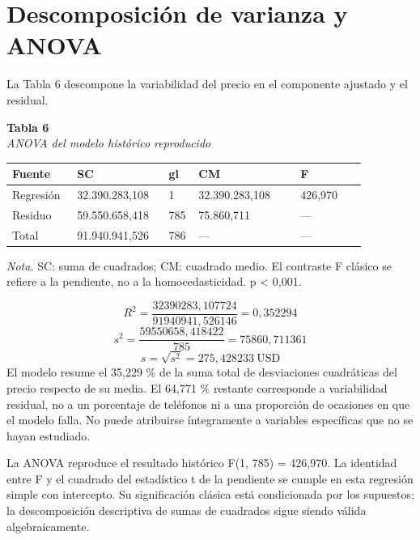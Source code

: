 \documentclass[12pt,letterpaper]{article}
\begin{document}
\clearpage
\section*{Descomposición de varianza y ANOVA}
La Tabla 6 descompone la variabilidad del precio en el componente ajustado y el residual.

\begin{center}\begin{minipage}{\linewidth}\textbf{Tabla 6}\\\textit{ANOVA del modelo histórico reproducido}\\\begin{singlespace}\small
\begin{tabular}{@{}p{0.1517\linewidth}p{0.2329\linewidth}p{0.0470\linewidth}p{0.2671\linewidth}p{0.1731\linewidth}@{}}\toprule
\textbf{Fuente} & \textbf{SC} & \textbf{gl} & \textbf{CM} & \textbf{F}\\\midrule
Regresión & 32.390.283,108 & 1 & 32.390.283,108 & 426,970\\
Residuo & 59.550.658,418 & 785 & 75.860,711 & —\\
Total & 91.940.941,526 & 786 & — & —\\
\bottomrule\end{tabular}\end{singlespace}
\small\textit{Nota.} SC: suma de cuadrados; CM: cuadrado medio. El contraste F clásico se refiere a la pendiente, no a la homocedasticidad. p < 0,001.
\end{minipage}\end{center}
\begin{equation*}R^2=\frac{32390283{,}107724}{91940941{,}526146}=0{,}352294\end{equation*}
\begin{equation*}s^2=\frac{59550658{,}418422}{785}=75860{,}711361\end{equation*}
\begin{equation*}s=\sqrt{s^2}=275{,}428233\ \mathrm{USD}\end{equation*}
El modelo resume el 35,229 \% de la suma total de desviaciones cuadráticas del precio respecto de su media. El 64,771 \% restante corresponde a variabilidad residual, no a un porcentaje de teléfonos ni a una proporción de ocasiones en que el modelo falla. No puede atribuirse íntegramente a variables específicas que no se hayan estudiado.

La ANOVA reproduce el resultado histórico F(1, 785) = 426,970. La identidad entre F y el cuadrado del estadístico t de la pendiente se cumple en esta regresión simple con intercepto. Su significación clásica está condicionada por los supuestos; la descomposición descriptiva de sumas de cuadrados sigue siendo válida algebraicamente.
\end{document}
